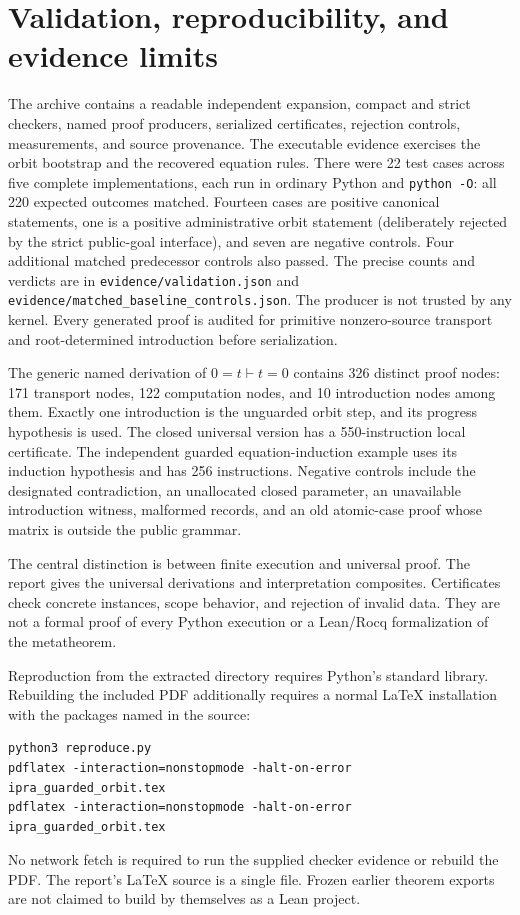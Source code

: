 \documentclass[11pt,letterpaper]{article}
\theoremstyle{definition}\newtheorem{definition}[theorem]{Definition}
\theoremstyle{remark}\newtheorem{remark}[theorem]{Remark}
\newcommand{\file}[1]{{\small\nolinkurl{#1}}}
\begin{document}
\section{Validation, reproducibility, and evidence limits}

The archive contains a readable independent expansion, compact and strict
checkers, named proof producers, serialized certificates, rejection controls,
measurements, and source provenance. The executable evidence exercises the
orbit bootstrap and the recovered equation rules. There were 22 test cases
across five complete implementations, each run in ordinary Python and
\texttt{python -O}: all 220 expected outcomes matched. Fourteen cases are
positive canonical statements, one is a positive administrative orbit
statement (deliberately rejected by the strict public-goal interface), and
seven are negative controls. Four additional matched predecessor controls
also passed. The precise counts and verdicts are in
\file{evidence/validation.json} and
\file{evidence/matched_baseline_controls.json}. The producer is not trusted
by any kernel. Every generated proof is audited for primitive nonzero-source
transport and root-determined introduction before serialization.

The generic named derivation of $0=t\vdash t=0$ contains 326 distinct proof
nodes: 171 transport nodes, 122 computation nodes, and 10 introduction
nodes among them. Exactly one introduction is the unguarded orbit step,
and its progress hypothesis is used. The closed universal version has a
550-instruction local certificate. The independent guarded equation-induction
example uses its induction hypothesis and has 256 instructions.
Negative controls include the designated contradiction, an unallocated
closed parameter, an unavailable introduction witness, malformed records,
and an old atomic-case proof whose matrix is outside the public grammar.

The central distinction is between finite execution and universal proof.
The report gives the universal derivations and interpretation composites.
Certificates check concrete instances, scope behavior, and rejection of
invalid data. They are not a formal proof of every Python execution or a
Lean/Rocq formalization of the metatheorem.

Reproduction from the extracted directory requires Python's standard
library. Rebuilding the included PDF additionally requires a normal LaTeX
installation with the packages named in the source:
\begin{lstlisting}
python3 reproduce.py
pdflatex -interaction=nonstopmode -halt-on-error ipra_guarded_orbit.tex
pdflatex -interaction=nonstopmode -halt-on-error ipra_guarded_orbit.tex
\end{lstlisting}
No network fetch is required to run the supplied checker evidence or rebuild
the PDF. The report's LaTeX source is a single file. Frozen earlier theorem
exports are not claimed to build by themselves as a Lean project.
\end{document}
